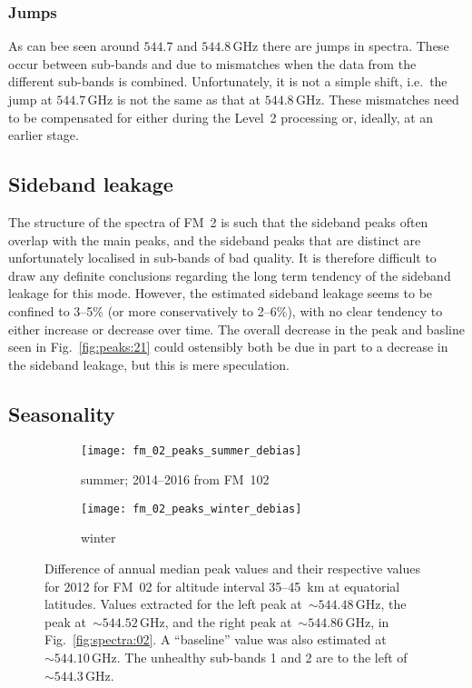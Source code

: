\subsubsection{Jumps}
\label{FM02:jumps}
As can bee seen around $544.7$ and $544.8\,\mathrm{GHz}$ there are jumps in
spectra.  These occur between sub-bands and due to mismatches when the data
from the different sub-bands is combined.  Unfortunately, it is not a simple
shift, i.e.\ the jump at $544.7\,\mathrm{GHz}$ is not the same as that at
$544.8\,\mathrm{GHz}$.  These mismatches need to be compensated for either
during the Level~2 processing or, ideally, at an earlier stage.


\subsection{Sideband leakage}
\label{FM02:sbl}
The structure of the spectra of FM~2 is such that the sideband peaks often
overlap with the main peaks, and the sideband peaks that are distinct are
unfortunately localised in sub-bands of bad quality.  It is therefore difficult
to draw any definite conclusions regarding the long term tendency of the
sideband leakage for this mode.  However, the estimated sideband leakage seems
to be confined to 3--5\% (or more conservatively to 2--6\%), with no clear
tendency to either increase or decrease over time.  The overall decrease in the
 peak and basline seen in Fig.~\ref{fig:peaks:21} could
ostensibly both be due in part to a decrease in the sideband leakage, but this
is mere speculation.


\subsection{Seasonality}
\label{FM02:seasonality}

\begin{figure}[ht]
    \centering
    \begin{subfigure}[b]{0.9545\textwidth}
        \texttt{[image: fm\_02\_peaks\_summer\_debias]}
        \caption{summer; 2014--2016 from FM~102}\label{fig:peaks:02:summer}
    \end{subfigure}
    \begin{subfigure}[b]{0.9545\textwidth}
        \texttt{[image: fm\_02\_peaks\_winter\_debias]}
        \caption{winter}\label{fig:peaks:02:winter}
    \end{subfigure}
    \caption{Difference of annual median peak values and their respective
        values for 2012 for FM~02 for altitude interval 35--45~km at
        equatorial latitudes. Values extracted for the left  peak
        at~$\sim544.48\,\mathrm{GHz}$, the  peak
        at~$\sim544.52\,\mathrm{GHz}$, and the right  peak
        at~$\sim544.86\,\mathrm{GHz}$, in Fig.~\ref{fig:spectra:02}.  A
        ``baseline'' value was also estimated
        at~$\sim544.10\,\mathrm{GHz}$.  The unhealthy sub-bands 1 and 2 are to
        the left of $\sim544.3\,\mathrm{GHz}$.
        }\label{fig:peaks:02}
\end{figure}


